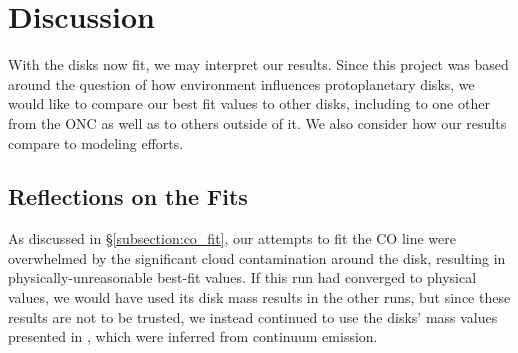 




\chapter{Discussion}
\label{chap:discussion}

With the disks now fit, we may interpret our results. Since this project was based around the question of how environment influences protoplanetary disks, we would like to compare our best fit values to other disks, including to one other from the ONC \citep{Factor2017} as well as to others outside of it. We also consider how our results compare to modeling efforts.


\section{Reflections on the Fits}

As discussed in \S\ref{subsection:co_fit}, our attempts to fit the CO line were overwhelmed by the significant cloud contamination around the disk, resulting in physically-unreasonable best-fit values. If this run had converged to physical values, we would have used its disk mass results in the other runs, but since these results are not to be trusted, we instead continued to use the disks' mass values presented in \citet{Williams2014}, which were inferred from continuum emission.


